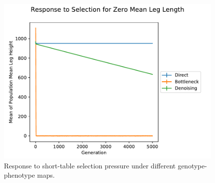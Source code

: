 \begin{figure}
  \includegraphics[width=\linewidth]{img/zero_leg_selection}
  \caption{Response to short-table selection pressure under different genotype-phenotype maps.}
  \label{fig:select_response}
\end{figure}

